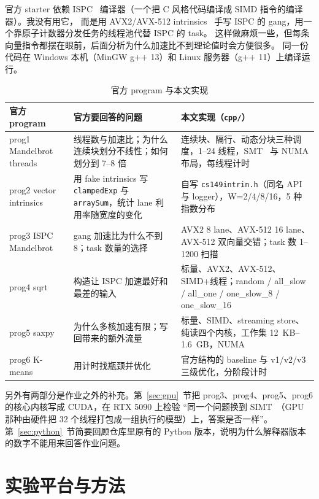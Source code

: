 \documentclass[11pt,a4paper]{ctexart}
\begin{document}
官方 starter 依赖 ISPC~\cite{ispc} 编译器（一个把 C 风格代码编译成 SIMD 指令的编译器）。我没有用它，
而是用 AVX2/AVX-512 intrinsics~\cite{intel} 手写 ISPC 的 gang，用一个靠原子计数器分发任务的线程池代替 ISPC 的 task。
这样做麻烦一些，但每条向量指令都摆在眼前，后面分析为什么加速比不到理论值时会方便很多。
同一份代码在 Windows 本机（MinGW g++ 13）和 Linux 服务器（g++ 11）上编译运行。

\begin{table}[H]
\centering
\caption{官方 program 与本文实现}
\label{tab:map}
\small
\begin{tabularx}{\linewidth}{>{\raggedright}p{2.6cm}>{\raggedright}X>{\raggedright\arraybackslash}X}
\toprule
官方 program & 官方要回答的问题 & 本文实现（\texttt{cpp/}） \\
\midrule
prog1 Mandelbrot threads & 线程数与加速比；为什么连续块划分不线性；如何划分到 7--8 倍 & 连续块、隔行、动态分块三种调度，1--24 线程，SMT~\cite{smt} 与 NUMA 布局，每线程计时 \\
prog2 vector intrinsics & 用 fake intrinsics 写 \texttt{clampedExp} 与 \texttt{arraySum}，统计 lane 利用率随宽度的变化 & 自写 \texttt{cs149intrin.h}（同名 API 与 logger），W=2/4/8/16，5 种指数分布 \\
prog3 ISPC Mandelbrot & gang 加速比为什么不到 8；task 数量的选择 & AVX2 8 lane、AVX-512 16 lane、AVX-512 双向量交错；task 数 1--1200 扫描 \\
prog4 sqrt & 构造让 ISPC 加速最好和最差的输入 & 标量、AVX2、AVX-512、SIMD+线程；random / all\_slow / all\_one / one\_slow\_8 / one\_slow\_16 \\
prog5 saxpy & 为什么多核加速有限；写回带来的额外流量 & 标量、SIMD、streaming store、纯读四个内核，工作集 12~KB--1.6~GB，NUMA \\
prog6 K-means~\cite{lloyd} & 用计时找瓶颈并优化 & 官方结构的 baseline 与 v1/v2/v3 三级优化，分阶段计时 \\
\bottomrule
\end{tabularx}
\end{table}

另外有两部分是作业之外的补充。第~\ref{sec:gpu}~节把 prog3、prog4、prog5、prog6 的核心内核写成 CUDA，在 RTX 5090 上检验
``同一个问题换到 SIMT~\cite{tesla}（GPU 那种由硬件把 32 个线程打包成一组执行的模型）上，答案是否一样''。
第~\ref{sec:python}~节简要回顾仓库里原有的 Python 版本，说明为什么解释器版本的数字不能用来回答作业问题。

\section{实验平台与方法}
\label{sec:setup}
\end{document}
